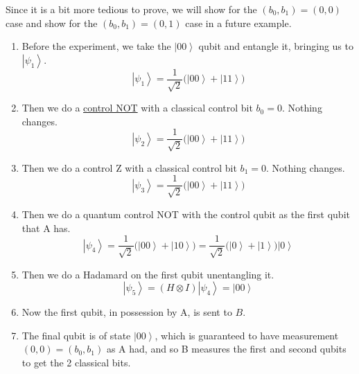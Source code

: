 \documentclass{article}
\newcommand{\ket}[1]{\ensuremath{\left|#1\right\rangle}}
\newcounter{example}[section]
\begin{document}
    \begin{example}
      \label{ex:superdense-coding-with-two-classical-0-bits}
      Since it is a bit more tedious to prove, we will show for the $(b_0, b_1) = (0, 0)$ case and show for the $(b_0, b_1) = (0, 1)$ case in a future example.
      \begin{enumerate} 
        \item Before the experiment, we take the $\ket{00}$ qubit and entangle it, bringing us to $\ket{\psi_1}$. 
          \begin{equation} 
            \ket{\psi_1} = \frac{1}{\sqrt{2}} \big( \ket{00} + \ket{11} \big)
          \end{equation}
        \item Then we do a \hyperref[def:control-not]{control NOT} with a classical control bit $b_0 = 0$. Nothing changes. 
          \begin{equation} 
            \ket{\psi_2} = \frac{1}{\sqrt{2}} \big( \ket{00} + \ket{11} \big)
          \end{equation}
        \item Then we do a control Z with a classical control bit $b_1 = 0$. Nothing changes. 
          \begin{equation} 
            \ket{\psi_3} = \frac{1}{\sqrt{2}} \big( \ket{00} + \ket{11} \big)
          \end{equation}
        \item Then we do a quantum control NOT with the control qubit as the first qubit that A has. 
          \begin{equation} 
            \ket{\psi_4} = \frac{1}{\sqrt{2}} \big( \ket{00} + \ket{10} \big) = \frac{1}{\sqrt{2}} \big( \ket{0} + \ket{1} \big) \ket{0}
          \end{equation}
        \item Then we do a Hadamard on the first qubit unentangling it. 
          \begin{equation} 
            \ket{\psi_5} = (H \otimes I) \ket{\psi_4} = \ket{00}
          \end{equation}
        \item Now the first qubit, in possession by A, is sent to $B$. 
        \item The final qubit is of state $\ket{00}$, which is guaranteed to have measurement $(0, 0) = (b_0, b_1)$ as A had, and so B measures the first and second qubits to get the 2 classical bits. 
      \end{enumerate}
    \end{example}
\end{document}
